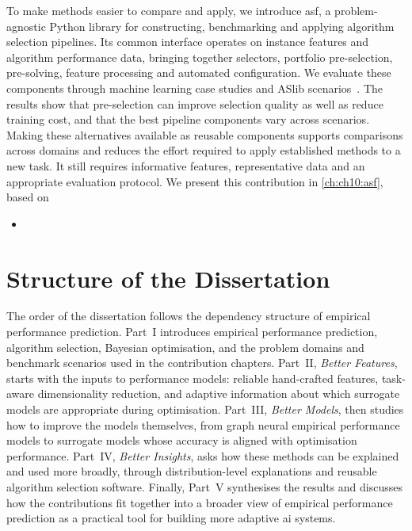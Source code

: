 To make methods easier to compare and apply, we introduce \gls{asf}, a problem-agnostic Python library for constructing, benchmarking and applying algorithm selection pipelines. Its common interface operates on instance features and algorithm performance data, bringing together selectors, portfolio pre-selection, pre-solving, feature processing and automated configuration. We evaluate these components through machine learning case studies and ASlib scenarios~\citep{BisEtAl16}. The results show that pre-selection can improve selection quality as well as reduce training cost, and that the best pipeline components vary across scenarios. Making these alternatives available as reusable components supports comparisons across domains and reduces the effort required to apply established methods to a new task. It still requires informative features, representative data and an appropriate evaluation protocol. We present this contribution in \cref{ch:ch10:asf}, based on
\begin{itemize}
    \item {}
\end{itemize}

\section{Structure of the Dissertation}

The order of the dissertation follows the dependency structure of empirical performance prediction.
Part~I introduces empirical performance prediction, algorithm selection, Bayesian optimisation, and the problem domains and benchmark scenarios used in the contribution chapters.
Part~II, \emph{Better Features}, starts with the inputs to performance models: reliable hand-crafted features, task-aware dimensionality reduction, and adaptive information about which surrogate models are appropriate during optimisation.
Part~III, \emph{Better Models}, then studies how to improve the models themselves, from graph neural empirical performance models to surrogate models whose accuracy is aligned with optimisation performance.
Part~IV, \emph{Better Insights}, asks how these methods can be explained and used more broadly, through distribution-level explanations and reusable algorithm selection software.
Finally, Part~V synthesises the results and discusses how the contributions fit together into a broader view of empirical performance prediction as a practical tool for building more adaptive \gls{ai} systems.
